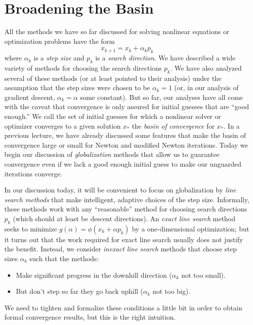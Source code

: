 \documentclass[12pt, leqno]{article} %
\begin{document}

\section{Broadening the Basin}

All the methods we have so far discussed for solving nonlinear
equations or optimization problems have the form
\[
  x_{k+1} = x_k + \alpha_k p_k
\]
where $\alpha_k$ is a {\em step size} and $p_k$ is a {\em search
  direction}.  We have described a wide variety of methods for
choosing the search directions $p_k$.  We have also analyzed several
of these methods (or at least pointed to their analysis) under the
assumption that the step sizes were chosen to be $\alpha_k = 1$ (or,
in our analysis of gradient descent, $\alpha_k = \alpha$ some
constant).  But so far, our analyses have all come with the caveat
that convergence is only assured for initial guesses that are ``good
enough.''  We call the set of initial guesses for which a nonlinear
solver or optimizer converges to a given solution $x_*$ the {\em basin
  of convergence} for $x_*$.  In a previous lecture, we have already
discussed some features that make the basin of convergence large or
small for Newton and modified Newton iterations.  Today we begin our
discussion of {\em globalization} methods that allow us to guarantee
convergence even if we lack a good enough initial guess to make our
unguarded iterations converge.

In our discussion today, it will be convenient to focus on
globalization by {\em line search methods} that make intelligent,
adaptive choices of the step size.  Informally, these methods work with any
``reasonable'' method for choosing search directions $p_k$ (which
should at least be descent directions).  An {\em exact line search}
method seeks to minimize $g(\alpha) = \phi(x_k + \alpha p_k)$ by a
one-dimensional optimization; but it turns out that the work required
for exact line search usually does not justify the benefit.  Instead,
we consider {\em inexact line search} methods that choose step sizes
$\alpha_k$ such that the methods:
\begin{itemize}
\item Make significant progress in the downhill direction
  ($\alpha_k$ not too small).
\item But don't step so far they go back uphill
  ($\alpha_k$ not too big).
\end{itemize}
We need to tighten and formalize these conditions a little bit in
order to obtain formal convergence results, but this is the right
intuition.
\end{document}
